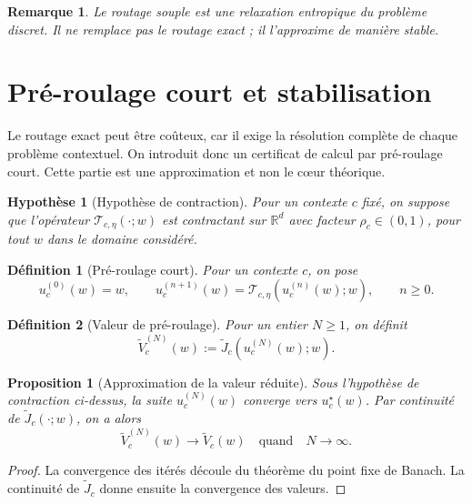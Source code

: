 \documentclass[11pt,a4paper]{article}
\newtheorem{definition}{Définition}[section]
\newtheorem{assumption}{Hypothèse}[section]
\newtheorem{proposition}{Proposition}[section]
\newtheorem{remark}{Remarque}[section]
\newcommand{\R}{\mathbb R}
\newcommand{\Tcal}{\mathcal T}
\begin{document}
\begin{remark}
Le routage souple est une relaxation entropique du problème discret. Il ne remplace pas le routage exact ; il l'approxime de manière stable.
\end{remark}

\section{Pré-roulage court et stabilisation}

Le routage exact peut être coûteux, car il exige la résolution complète de chaque problème contextuel. On introduit donc un certificat de calcul par pré-roulage court. Cette partie est une approximation et non le cœur théorique.

\begin{assumption}[Hypothèse de contraction]
Pour un contexte \(c\) fixé, on suppose que l'opérateur \(\Tcal_{c,\eta}(\cdot;w)\) est contractant sur \(\R^d\) avec facteur \(\rho_c\in(0,1)\), pour tout \(w\) dans le domaine considéré.
\end{assumption}

\begin{definition}[Pré-roulage court]
Pour un contexte \(c\), on pose
\[
u_c^{(0)}(w)=w,
\qquad
u_c^{(n+1)}(w)=\Tcal_{c,\eta}(u_c^{(n)}(w);w),
\qquad n\ge 0.
\]
\end{definition}

\begin{definition}[Valeur de pré-roulage]
Pour un entier \(N\ge 1\), on définit
\[
\widetilde V_c^{(N)}(w):=\widetilde J_c(u_c^{(N)}(w);w).
\]
\end{definition}

\begin{proposition}[Approximation de la valeur réduite]
Sous l'hypothèse de contraction ci-dessus, la suite \(u_c^{(N)}(w)\) converge vers \(u_c^\star(w)\). Par continuité de \(\widetilde J_c(\cdot;w)\), on a alors
\[
\widetilde V_c^{(N)}(w)\longrightarrow \widetilde V_c(w)
\quad\text{quand}\quad N\to\infty.
\]
\end{proposition}

\begin{proof}
La convergence des itérés découle du théorème du point fixe de Banach. La continuité de \(\widetilde J_c\) donne ensuite la convergence des valeurs.
\end{proof}
\end{document}
